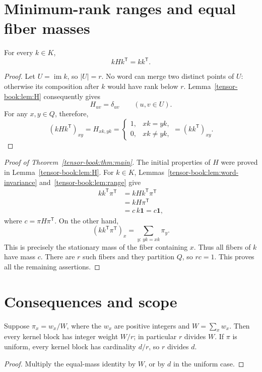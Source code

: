 \section{Minimum-rank ranges and equal fiber masses}
\begin{lemma}\label{tensor-book:lem:range}
For every $k\in K$,
\begin{equation}\label{tensor-book:eq:range}
 kHk^{\mathsf{T}}=kk^{\mathsf{T}}.
\end{equation}
\end{lemma}
\begin{proof}
Let $U=\operatorname{im} k$, so $|U|=r$. No word can merge two distinct points of
$U$: otherwise its composition after $k$ would have rank below $r$.
Lemma~\ref{tensor-book:lem:H} consequently gives
\[
 H_{uv}=\delta_{uv}\qquad(u,v\in U).
\]
For any $x,y\in Q$, therefore,
\[
 (kHk^{\mathsf{T}})_{xy}=H_{xk,yk}
 =\begin{cases}1,&xk=yk,\\0,&xk\ne yk,\end{cases}
 =(kk^{\mathsf{T}})_{xy}.
\]
\end{proof}

\begin{proof}[Proof of Theorem~\ref{tensor-book:thm:main}]
The initial properties of $H$ were proved in Lemma~\ref{tensor-book:lem:H}.
For $k\in K$, Lemmas~\ref{tensor-book:lem:word-invariance} and~\ref{tensor-book:lem:range}
give
\[
 \begin{aligned}
 kk^{\mathsf{T}}\pi^{\mathsf{T}}
 &=kHk^{\mathsf{T}}\pi^{\mathsf{T}}\\
 &=kH\pi^{\mathsf{T}}\\
 &=c\,k\mathbf{1}=c\mathbf{1},
 \end{aligned}
\]
where $c=\pi H\pi^{\mathsf{T}}$. On the other hand,
\[
 (kk^{\mathsf{T}}\pi^{\mathsf{T}})_x
 =\sum_{y:\,yk=xk}\pi_y.
\]
This is precisely the stationary mass of the fiber containing $x$.
Thus all fibers of $k$ have mass $c$. There are $r$ such fibers and
they partition $Q$, so $rc=1$. This proves all the remaining assertions.
\end{proof}

\section{Consequences and scope}
\begin{corollary}
Suppose $\pi_x=w_x/W$, where the $w_x$ are positive integers and
$W=\sum_xw_x$. Then every kernel block has integer weight $W/r$;
in particular $r$ divides $W$.
If $\pi$ is uniform, every kernel block has cardinality $d/r$, so
$r$ divides $d$.
\end{corollary}
\begin{proof}
Multiply the equal-mass identity by $W$, or by $d$ in the uniform case.
\end{proof}

